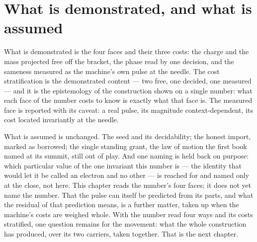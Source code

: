 \section{What is demonstrated, and what is assumed}
\label{se:demonstrated-assumed-III6}

What is demonstrated is the four faces and their three costs: the charge and the mass projected free off the
bracket, the phase read by one decision, and the sameness measured as the machine's own pulse at the needle.
The cost stratification is the demonstrated content --- two free, one decided, one measured --- and it is
the epistemology of the construction shown on a single number: what each face of the number costs to know is
exactly what that face is. The measured face is reported with its caveat: a real pulse, its magnitude
context-dependent, its cost located invariantly at the needle.

What is assumed is unchanged. The seed and its decidability; the honest import, marked as borrowed; the
single standing grant, the law of motion the first book named at its summit, still out of play. And one
naming is held back on purpose: which particular value of the one invariant this number is --- the identity
that would let it be called an electron and no other --- is reached for and named only at the close, not
here. This chapter reads the number's four faces; it does not yet name the number. That the pulse can itself
be predicted from its parts, and what the residual of that prediction means, is a further matter, taken up
when the machine's costs are weighed whole. With the number read four ways and its costs stratified, one
question remains for the movement: what the whole construction has produced, over its two carriers, taken
together. That is the next chapter.
